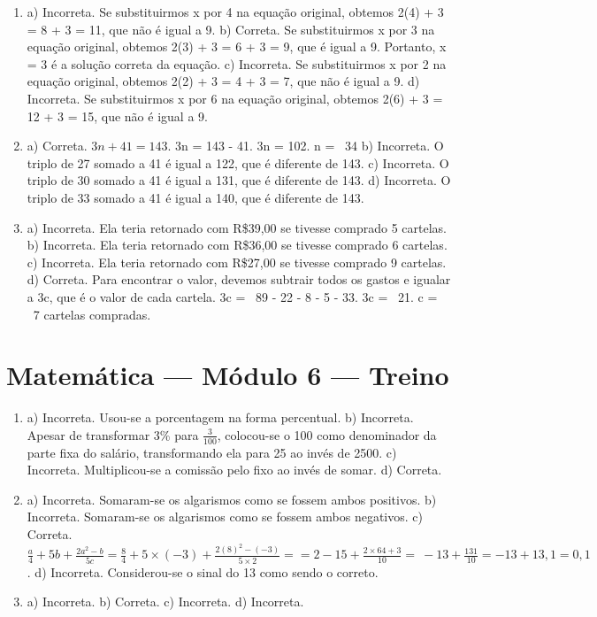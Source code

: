 \begin{enumerate}
\item a) Incorreta. Se substituirmos x por 4 na equação original, obtemos 2(4) + 3 = 8 + 3 = 11, que não é igual a 9.
b) Correta. Se substituirmos x por 3 na equação original, obtemos 2(3) + 3 = 6 + 3 = 9, que é igual a 9. Portanto, x = 3 é a solução correta da equação.
c) Incorreta. Se substituirmos x por 2 na equação original, obtemos 2(2) + 3 = 4 + 3 = 7, que não é igual a 9.
d) Incorreta. Se substituirmos x por 6 na equação original, obtemos 2(6) + 3 = 12 + 3 = 15, que não é igual a 9.

\item a) Correta. \(3n + 41 = 143\). 3n = 143 - 41. 3n = 102. n = \ 34
b) Incorreta. O triplo de 27 somado a 41 é igual a 122, que é diferente de 143.
c) Incorreta. O triplo de 30 somado a 41 é igual a 131, que é diferente de 143.
d) Incorreta. O triplo de 33 somado a 41 é igual a 140, que é diferente de 143.

\item a) Incorreta. Ela teria retornado com R\$39,00 se tivesse comprado 5 cartelas.
b) Incorreta. Ela teria retornado com R\$36,00 se tivesse comprado 6 cartelas.
c) Incorreta. Ela teria retornado com R\$27,00 se tivesse comprado 9 cartelas.
d) Correta. Para encontrar o valor, devemos subtrair todos os gastos e igualar a 3c, que é o valor de cada cartela. 3c = \ 89 - 22 - 8 - 5 - 33. 3c = \ 21. c = \ 7 cartelas compradas.
\end{enumerate}

\section*{Matemática — Módulo 6 — Treino}

\begin{enumerate}
\item a) Incorreta. Usou-se a porcentagem na forma percentual.
b) Incorreta. Apesar de transformar 3\% para $\frac{3}{100}$, colocou-se o 100 como denominador da parte fixa do salário, transformando ela para 25 ao invés de 2500.
c) Incorreta. Multiplicou-se a comissão pelo fixo ao invés de somar.
d) Correta. 


\item a) Incorreta. Somaram-se os algarismos como se fossem ambos positivos.
b) Incorreta. Somaram-se os algarismos como se fossem ambos negativos.
c) Correta. $\frac{a}{4} + 5b + \frac{2a^{2} - b}{5c} = \frac{8}{4} + 5 \times \left( - 3 \right) + \frac{2\left( 8 \right)^{2} - \left( - 3 \right)}{5 \times 2} = = 2 - 15 + \frac{2 \times 64 + 3}{10} = \  - 13 + \frac{131}{10} = - 13 + 13,1 = 0,1$.
d) Incorreta. Considerou-se o sinal do 13 como sendo o correto.


\item a) Incorreta.
b) Correta.  
c) Incorreta. 
d) Incorreta.
\end{enumerate}

